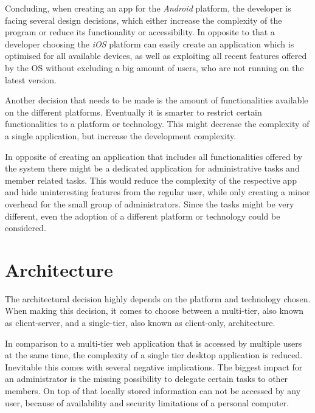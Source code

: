 Concluding, when creating an app for the \emph{Android} platform, the developer is facing several design decisions, which either increase the complexity of the program or reduce its functionality or accessibility. In opposite to that a developer choosing the \emph{iOS} platform can easily create an application which is optimised for all available devices, as well as exploiting all recent features offered by the \acrlong{OS} without excluding a big amount of users, who are not running on the latest version. 

Another decision that needs to be made is the amount of functionalities available on the different platforms. Eventually it is smarter to restrict certain functionalities to a platform or technology. This might decrease the complexity of a single application, but increase the development complexity.

In opposite of creating an application that includes all functionalities offered by the system there might be a dedicated application for administrative tasks and member related tasks. This would reduce the complexity of the respective app and hide uninteresting features from the regular user, while only creating a minor overhead for the small group of administrators. Since the tasks might be very different, even the adoption of a different platform or technology could be considered. 

\section{Architecture} %
\label{sec:Architecture}
The architectural decision highly depends on the platform and technology chosen. When making this decision, it comes to choose between a multi-tier, also known as client-server, and a single-tier, also known as client-only, architecture.

In comparison to a multi-tier web application that is accessed by multiple users at the same time, the complexity of a single tier desktop application is reduced. Inevitable this comes with several negative implications. The biggest impact for an administrator is the missing possibility to delegate certain tasks to other members. On top of that locally stored information can not be accessed by any user, because of availability and security limitations of a personal computer.


